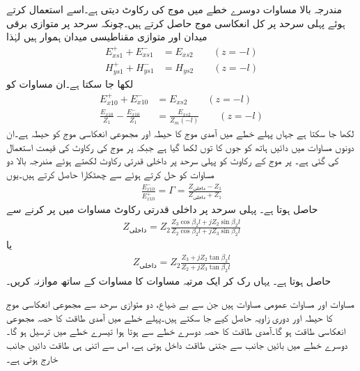 مندرجہ بالا مساوات دوسرے خطے میں موج کی رکاوٹ دیتی ہے۔اسے استعمال کرتے ہوئے پہلی سرحد پر کل انعکاسی موج حاصل کرتے ہیں۔چونکہ سرحد پر متوازی برقی میدان  اور متوازی مقناطیسی میدان  ہموار ہیں لہٰذا
\begin{align}
E_{xs1}^++E_{xs1}^-&=E_{xs2} \quad \quad (z=-l)\\
H_{ys1}^++H_{ys1}^-&=H_{ys2} \quad \quad (z=-l)
\end{align}
لکھا جا سکتا ہے۔ان مساوات کو
\begin{align}
E_{x10}^+ + E_{x10}^- &=E_{xs2} \quad \quad (z=-l)\\
\frac{E_{x10}}{Z_1}-\frac{E_{x10}^-}{Z_1}&=\frac{E_{xs2}}{Z_m(-l)} \quad \quad (z=-l)
\end{align}
لکھا جا سکتا ہے جہاں پہلے خطے میں آمدی موج کا حیطہ  اور مجموعی انعکاسی موج کو حیطہ  ہے۔ان دونوں مساوات میں دائیں ہاتھ  کو جوں کا توں لکھا گیا ہے جبکہ  پر موج کی رکاوٹ کی قیمت  استعمال کی گئی ہے۔  پر موج کے رکاوٹ کو پہلی سرحد پر داخلی قدرتی رکاوٹ  لکھتے ہوئے مندرجہ بالا دو مساوات کو حل کرتے ہوئے  سے چھٹکارا حاصل کرتے ہیں۔یوں
\begin{align}\label{مساوات_مستوی_شرح_انعکاس_دو_سرحدی}
\frac{E_{x10}^-}{E_{x10}^+}=\Gamma=\frac{Z_{\text{داخلی}}-Z_1}{Z_{\text{داخلی}}+Z_1}
\end{align}
حاصل ہوتا ہے۔ پہلی سرحد پر داخلی قدرتی رکاوٹ مساوات  میں  پر کرنے سے
\begin{align}\label{مساوات_مستوی_داخلی_رکاوٹ_دو_سرحدی}
Z_{\text{داخلی}}= Z_2 \frac{Z_3 \cos \beta_2 l +j Z_2 \sin \beta_2 l}{Z_2 \cos \beta_2 l +j Z_3\sin \beta_2 l}
\end{align}
یا
\begin{align}\label{مساوات_مستوی_داخلی_رکاوٹ_دو_سرحدی_ب}
Z_{\text{داخلی}}= Z_2 \frac{Z_3  +j Z_2 \tan \beta_2 l}{Z_2  +j Z_3\tan \beta_2 l}
\end{align}
حاصل ہوتا ہے۔  یہاں رک کر ایک مرتبہ مساوات  کا مساوات  کے ساتھ موازنہ کریں۔

مساوات  اور مساوات  عمومی مساوات ہیں جن سے  بے ضیاع، دو متوازی سرحد سے  مجموعی انعکاسی موج کا حیطہ اور دوری زاویہ حاصل کیے جا سکتے ہیں۔پہلے خطے میں آمدی طاقت کا   حصہ مجموعی انعکاسی طاقت ہو گا۔آمدی طاقت کا  حصہ دوسرے خطے سے ہوتا ہوا تیسرے خطے میں ترسیل ہو گا۔دوسرے خطے میں بائیں جانب سے جتنی طاقت داخل ہوتی ہے، اس سے اتنی ہی طاقت دائیں جانب خارج ہوتی ہے۔

